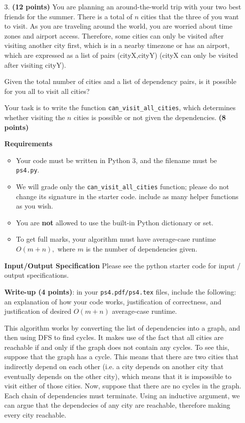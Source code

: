 \documentclass{assignment-263}
\begin{document}
\begin{enumerate}
\item[3.] \textbf{(12 points)}
  You are planning an around-the-world trip with your two best friends for the summer. 
There is a total of $n$ cities that the three of you want to visit.
As you are traveling around the world, you are worried about time zones and airport access. Therefore, some cities can only be visited after visiting another city first, which is in a nearby timezone or has an airport, which are expressed as a list of pairs (cityX,cityY) (cityX can only be visited after visiting cityY).

Given the total number of cities and a list of dependency pairs, is it possible for you all to visit all cities?

Your task is to write the function \verb|can_visit_all_cities|, which determines whether visiting the $n$ cities is possible or not given the dependencies. \textbf{(8 points)}

\textbf{Requirements}
\begin{itemize}
\item Your code must be written in Python 3, and the filename must be \verb|ps4.py|.
\item We will grade only the \verb|can_visit_all_cities| function; please do not change its signature in the starter code. include as many helper functions as you wish.
\item You are {\bf not} allowed to use the built-in Python dictionary or set.
\item To get full marks, your algorithm must have average-case runtime
  ${O}(m + n),$ where $m$ is the number of dependencies given.
\end{itemize}

\textbf{Input/Output Specification}
Please see the python starter code for input / output
specifications. 

\textbf{Write-up (4 points)}: in your \verb|ps4.pdf/ps4.tex| files,
include the following: an explanation of how your code works,
justification of correctness, and justification of desired
${O}(m + n)$ average-case runtime.

This algorithm works by converting the list of dependencies into a graph, and then using DFS to find cycles. It makes use of the fact that all cities are reachable if and only if the graph does not contain any cycles. To see this, suppose that the graph has a cycle. This means that there are two cities that indirectly depend on each other (i.e. a city depends on another city that eventually depends on the other city), which means that it is impossible to visit either of those cities. Now, suppose that there are no cycles in the graph. Each chain of dependencies must terminate. Using an inductive argument, we can argue that the dependecies of any city are reachable, therefore making every city reachable.


\end{enumerate}
\end{document}
